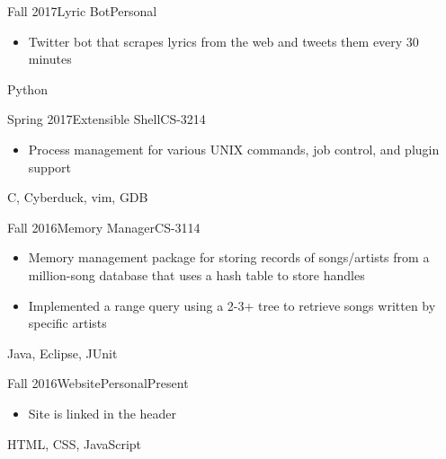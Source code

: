 
\begin{projects}
	\project
	{Fall 2017}{Lyric Bot}{Personal}{} {
		\begin{itemize}
			\item Twitter bot that scrapes lyrics from the web and tweets them every 30 minutes
		\end{itemize}
	}
	{Python}
	\emptySeparator
	        
	\project
	{Spring 2017}{Extensible Shell}{CS-3214}{} {
		\begin{itemize}
			\item Process management for various UNIX commands, job control, and plugin support
		\end{itemize}
	}
	{C, Cyberduck, vim, GDB}
	\emptySeparator
	    
	\project
	{Fall 2016}{Memory Manager}{CS-3114}{} {
		\begin{itemize}
			\item Memory management package for storing records of songs/artists from a million-song database that uses a hash table to store handles
			\item Implemented a range query using a 2-3+ tree to retrieve songs written by specific artists
		\end{itemize}
	}
	{Java, Eclipse, JUnit}
	\emptySeparator
	
	\project
	{Fall 2016}{Website}{Personal}{Present} {
		\begin{itemize}
			\item Site is linked in the header 
		\end{itemize}
	}
	{HTML, CSS, JavaScript}
	\emptySeparator
\end{projects}